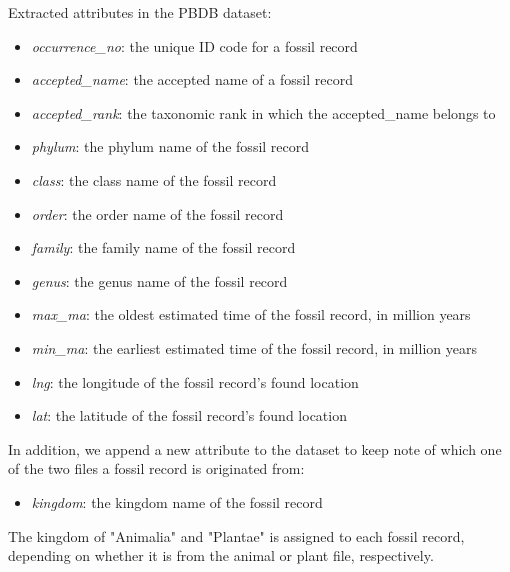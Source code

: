 \documentclass[11pt, a4paper,oneside,chapterprefix=false]{scrbook}
\begin{document}
\noindent Extracted attributes in the PBDB dataset:
\begin{itemize}
	\item \textit{occurrence\_no}: the unique ID code for a fossil record
	\item \textit{accepted\_name}: the accepted name of a fossil record
	\item \textit{accepted\_rank}: the taxonomic rank in which the accepted\_name belongs to 
	\item \textit{phylum}: the phylum name of the fossil record
	\item \textit{class}: the class name of the fossil record
	\item \textit{order}: the order name of the fossil record
	\item \textit{family}: the family name of the fossil record
	\item \textit{genus}: the genus name of the fossil record
	\item \textit{max\_ma}: the oldest estimated time of the fossil record, in million years
	\item \textit{min\_ma}: the earliest estimated time of the fossil record, in million years
	\item \textit{lng}: the longitude of the fossil record's found location 
	\item \textit{lat}: the latitude of the fossil record's found location 
	
\end{itemize}

In addition, we append a new attribute to the dataset to keep note of which one of the two files a fossil record is originated from: 

\begin{itemize}
	\item \textit{kingdom}: the kingdom name of the fossil record	
\end{itemize}

The kingdom of "Animalia" and "Plantae" is assigned to each fossil record, depending on whether it is from the animal or plant file, respectively. \\
\end{document}
